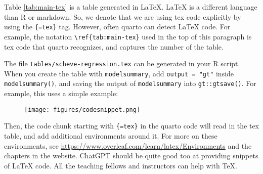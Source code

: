 \documentclass[12pt, ]{article}
\begin{document}
Table \ref{tab:main-tex} is a table generated in LaTeX. LaTeX is a
different language than R or markdown. So, we denote that we are using
tex code explicitly by using the \texttt{\{=tex\}} tag. However, often
quarto can detect LaTeX code. For example, the notation
\texttt{\textbackslash{}ref\{tab:main-tex\}} used in the top of this
paragraph is tex code that quarto recognizes, and captures the number of
the table.

The file \texttt{tables/scheve-regression.tex} can be generated in your
R script. When you create the table with \texttt{modelsummary}, add
\texttt{output\ =\ "gt"} inside \texttt{modelsummary()}, and saving the
output of \texttt{modelsummary} into \texttt{gt::gtsave()}. For example,
this uses a simple example:

\begin{figure}[tbp]

{\centering \texttt{[image: figures/codesnippet.png]}

}

\end{figure}

Then, the code chunk starting with \texttt{\{=tex\}} in the quarto code
will read in the tex table, and add additional environments around it.
For more on these environments, see
\url{https://www.overleaf.com/learn/latex/Environments} and the chapters
in the website. ChatGPT should be quite good too at providing snippets
of LaTeX code. All the teaching fellows and instructors can help with
TeX.

\end{document}

